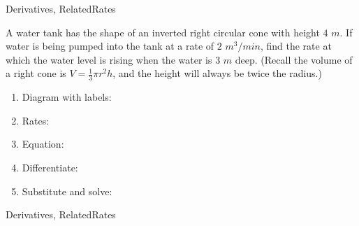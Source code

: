 

	
\begin{tagblock}{Derivatives, RelatedRates}
\begin{question}
	

A water tank has the shape of an inverted right circular cone with height $4$ $m$. If water is being pumped into the tank at a rate of $2$ $m^3/min$, find the rate at which the water level is rising when the water is $3$ $m$ deep. (Recall the volume of a right cone is $V=\frac{1}{3}\pi r^2 h$, and the height will always be twice the radius.)
\begin{enumerate}
 \item Diagram with labels:
 \vspace{1.in}
 \item Rates:
 \vspace{1in}
 \item Equation:  
 \vspace{1in}
 \item Differentiate:
 \vspace{1.5in}
 \item Substitute and solve:
 \vspace{1in}
\end{enumerate}




	
\begin{tags}
	    Derivatives, RelatedRates
\end{tags}
	
\begin{diary}
\end{diary}
	
\begin{solution}
	   
\end{solution}
	
\end{question}

\end{tagblock}



